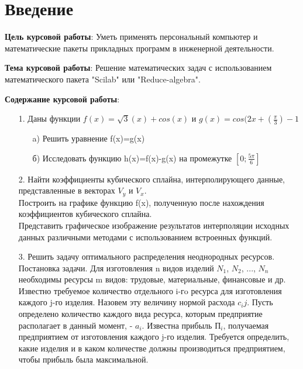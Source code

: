 \documentclass[russian,utf8,nocolumnxxxi,nocolumnxxxii]{eskdtext}
\begin{document}
\maketitle

\newpage
\tableofcontents

\newpage

\section{Введение}

\textbf{Цель курсовой работы}: Уметь применять персональный компьютер и математические пакеты прикладных программ в инженерной деятельности.

\textbf{Тема курсовой работы}: Решение математических задач с использованием математического пакета
"Scilab" или "Reduce-algebra".

\textbf{Содержание курсовой работы}:
\begin{enumerate}
    \item[1.] Даны функции $f(x)=\sqrt{3}(x)+cos(x)$ и $g(x)=cos(2x+(\frac{\pi}{3})-1$
\begin{enumerate}
    \item[a)] Решить уравнение f(x)=g(x)
    \item[б)] Исследовать функцию h(x)=f(x)-g(x) на промежутке $[0;\frac{5\pi}{6}]$
\end{enumerate}
    \item[2.] Найти коэффициенты кубического сплайна, интерполирующего данные, представленные в векторах $V_y$ и $V_x$.
    \\Построить на графике функцию f(x), полученную после нахождения коэффициентов кубического сплайна.
    \\Представить графическое изображение результатов интерполяции исходных данных различными методами с использованием встроенных функций.
    \item[3.]Решить задачу оптимального распределения неоднородных ресурсов. Постановка задачи. Для изготовления n видов изделий $N_1$, $N_2$, ..., $N_n$ необходимы ресурсы m видов: трудовые, материальные, финансовые и др. Известно требуемое количество отдельного i-гo ресурса для изготовления каждого j-го изделия. Назовем эту величину нормой расхода  $c_ij$. Пусть определено количество каждого вида ресурса, которым предприятие располагает в данный момент, - $a_i$. Известна прибыль $П_i$, получаемая предприятием от изготовления каждого j-го изделия. Требуется определить, какие изделия и в каком количестве должны производиться предприятием, чтобы прибыль была максимальной.
\end{enumerate}
\end{document}
